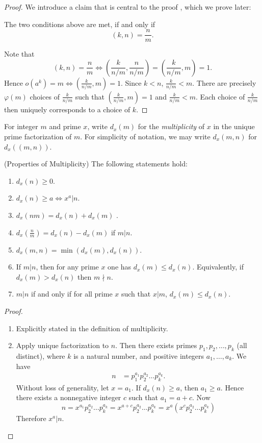 \begin{enumerate}
\begin{proof}
	We introduce a claim that is central to the proof , which we prove later:
	\begin{claim}
		The two conditions above are met, if and only if \[
			(k,n) = \frac{n}{m}
		.\] 
	\end{claim}

	Note that
	\[
			(k,n) = \frac{n}{m} \iff
		\left( \frac{k}{n / m}, \frac{n}{n / m} \right) = \left( \frac{k}{n / m},m \right) = 1 
	.\] 
	Hence $o(a^k) = m \iff \left(\frac{k}{n / m},m\right) = 1$. Since $k < n$, $\frac{k}{n / m}< m$. 
	There are precisely $\varphi(m)$ choices of $\frac{k}{n / m}$ such that $\left(\frac{k}{n / m},m\right) = 1$ and $\frac{k}{n / m}< m$. Each choice of $\frac{k}{n / m}$ then uniquely corresponds to a choice of $k$.
\end{proof}
	\begin{notation}
		For integer $m$ and prime $x$, write  $d_x(m)$ for the \textit{multiplicity} of $x$ in the unique prime factorization of $m$. For simplicity of notation, we may write $d_x(m,n)$ for $d_x((m,n))$.
	\end{notation}
	\begin{lemma}
		(Properties of Multiplicity) The following statements hold:
		\begin{enumerate}
			\item $d_x(n)\ge  0$.
			\item $d_x(n)\ge a \iff x^a | n$.
			\item $d_x(nm) = d_x(n) + d_x(m)$ .
			\item $d_x(\frac{n}{m}) = d_x(n) - d_x(m)$ if $m | n$.
			\item  $d_x(m,n) = \min(d_x(m), d_x(n))$.
			\item If $m | n$, then for any prime $x$ one has $d_x(m) \le  d_x(n)$. Equivalently, if $d_x(m) > d_x(n)$ then $m \nmid n$.
			\item $m | n$ if and only if for all prime $x$ such that $x | m$, $d_x(m) \le  d_x(n)$.
		\end{enumerate}
	\end{lemma}
	\begin{proof}
		\begin{enumerate}
			\item Explicitly stated in the definition of multiplicity.
			\item Apply unique factorization to $n$. Then there exists primes  $p_1, p_2,\ldots,p_k$ (all distinct), where $k$ is a natural number, and positive integers $a_1, \ldots,a_k$. We have
\begin{align*}
	n &= p_1^{a_1}p_2^{a_2}\ldots p_k^{a_k}
.\end{align*}
Without loss of generality, let $x = a_1$.
If $d_x(n)\ge a$, then $a_1 \ge  a$. Hence there exists a nonnegative integer $c$ such that $a_1 = a + c$. Now
\[
	n = x^{a_1}p_2^{a_2}\ldots p_k^{a_k}= x^{a + c}p_2^{a_2}\ldots p_k^{a_k}= x^{a}\left( x^cp_2^{a_2}\ldots p_k^{a_k} \right) 
\] 
Therefore $x^a | n$.


\end{enumerate}
\end{proof}
\end{enumerate}
